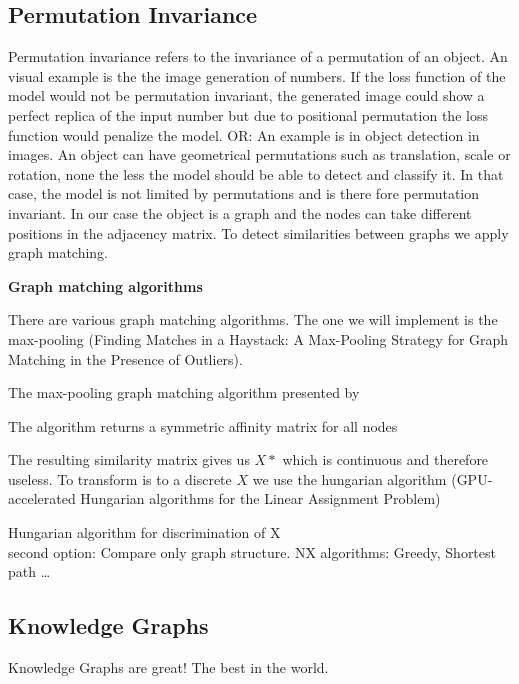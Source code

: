 \subsection{Permutation Invariance}


Permutation invariance refers to the invariance of a permutation of an object. An visual example is the the image generation of numbers. If the loss function of the model would not be permutation invariant, the generated image could show a perfect replica of the input number but due to positional permutation the loss function would penalize the model. 
OR: An example is in object detection in images. An object can have geometrical permutations such as translation, scale or rotation, none the less the model should be able to detect and classify it. In that case, the model is not limited by permutations and  is there fore permutation invariant.
In our case the object is a graph and the nodes can take different positions in the adjacency matrix. To detect similarities between graphs we apply graph matching.

\textbf{Graph matching algorithms}

There are various graph matching algorithms. The one we will implement is the max-pooling (Finding Matches in a Haystack: A Max-Pooling Strategy for Graph Matching in the Presence of Outliers). 

The max-pooling graph matching algorithm presented by

The algorithm returns a symmetric affinity matrix for all nodes

The resulting similarity matrix gives us $X*$ which is continuous and therefore useless. To transform is to a discrete $X$ we use the hungarian algorithm (GPU-accelerated Hungarian algorithms for the Linear
Assignment Problem)

Hungarian algorithm for discrimination of X
\\
second option:
Compare only graph structure. 
NX algorithms: Greedy, Shortest path \dots



\subsection{Knowledge Graphs}

Knowledge Graphs are great! The best in the world.
